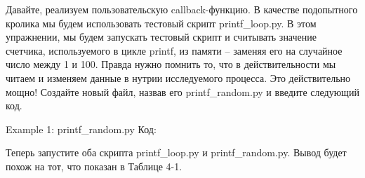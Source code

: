 \documentclass[12pt]{book}
\begin{document}
Давайте, реализуем пользовательскую callback-функцию. В качестве подопытного кролика мы будем использовать тестовый скрипт printf\_loop.py. В этом упражнении, мы будем запускать тестовый скрипт и считывать значение счетчика, используемого в цикле printf, из памяти – заменяя его на случайное число между 1 и 100. Правда нужно помнить то, что в действительности мы читаем и изменяем данные в нутрии исследуемого процесса. Это действительно мощно! Создайте новый файл, назвав его printf\_random.py и введите следующий код.

Example 1: printf\_random.py
Код:











Теперь запустите оба скрипта printf\_loop.py и printf\_random.py. Вывод будет похож на тот, что показан в Таблице 4-1.
\end{document}
